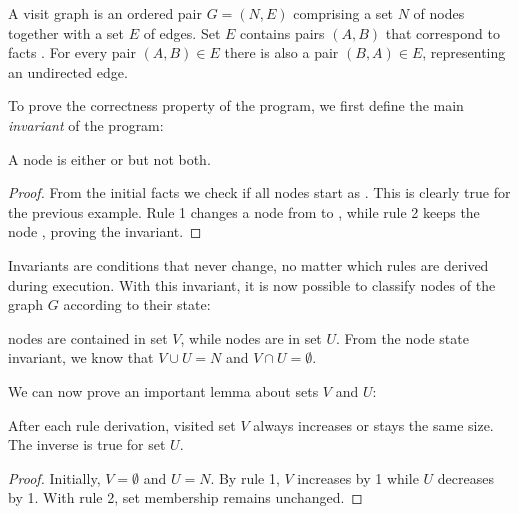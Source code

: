 \begin{definition}
A visit graph is an ordered pair $G = (N, E)$ comprising a set $N$ of nodes together
with a set $E$ of edges. Set $E$ contains pairs $(A, B)$ that correspond to
facts . For every pair $(A, B) \in E$ there is also a
pair $(B, A) \in E$, representing an undirected edge.
\end{definition}

To prove the correctness property of the program, we first define the main
\emph{invariant} of the program:

\begin{invariant}
A node is either  or  but not both.
\end{invariant}

\begin{proof}

From the initial facts we check if all nodes start as . This is
clearly true for the previous example. Rule 1 changes a node from
 to , while rule 2 keeps the node ,
proving the invariant.

\end{proof}

Invariants are conditions that never change, no matter which rules are derived
during execution. With this invariant, it is now possible to classify nodes of
the graph $G$ according to their state:

\begin{definition}  nodes are contained in set $V$,
while  nodes are in set $U$. From the node state invariant, we
know that $V \cup U = N$ and $V \cap U = \emptyset$.
\end{definition}

We can now prove an important lemma about sets $V$ and $U$:

\begin{invariant}

After each rule derivation, visited set $V$ always increases or stays the same
size. The inverse is true for set $U$.

\end{invariant}
\begin{proof}
Initially, $V = \emptyset$ and $U = N$.
By rule 1, $V$ increases by 1 while $U$ decreases by 1. With rule 2, set
membership remains unchanged.
\end{proof}

